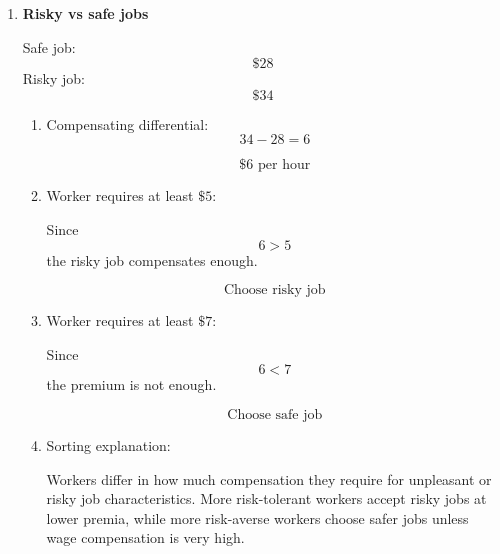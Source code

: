 \documentclass[12pt]{article}
\begin{document}
\begin{enumerate}
\begin{enumerate}[label=(\alph*)]
    \item Compare with original monopsony outcome:

    Original monopsony employment:
    \[
    32
    \]
    New employment:
    \[
    40
    \]

    \[
    \boxed{\text{Employment rises}}
    \]

    \item Explanation:

    Under monopsony, the firm hires too few workers because hiring more labour drives up wages. A minimum wage can flatten marginal labour cost over some range, allowing the firm to hire more workers and move closer to the competitive outcome.
\end{enumerate}

\section*{Part V: Compensating Wage Differentials}

\item \textbf{Risky vs safe jobs}

Safe job:
\[
\$28
\]
Risky job:
\[
\$34
\]

\begin{enumerate}[label=(\alph*)]
    \item Compensating differential:
    \[
    34-28=6
    \]

    \[
    \boxed{\$6 \text{ per hour}}
    \]

    \item Worker requires at least \(\$5\):

    Since
    \[
    6>5
    \]
    the risky job compensates enough.

    \[
    \boxed{\text{Choose risky job}}
    \]

    \item Worker requires at least \(\$7\):

    Since
    \[
    6<7
    \]
    the premium is not enough.

    \[
    \boxed{\text{Choose safe job}}
    \]

    \item Sorting explanation:

    Workers differ in how much compensation they require for unpleasant or risky job characteristics. More risk-tolerant workers accept risky jobs at lower premia, while more risk-averse workers choose safer jobs unless wage compensation is very high.
\end{enumerate}


\end{enumerate}
\end{document}
